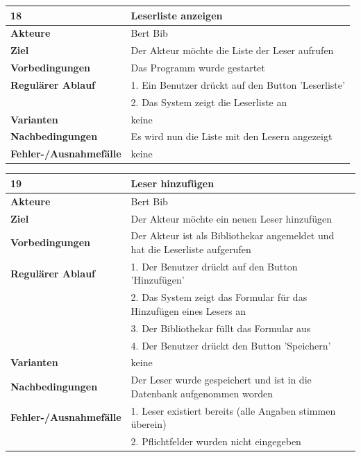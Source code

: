 \documentclass[fontsize=12pt,paper=a4,twoside]{scrartcl}
\begin{document}
\begin{table}[htbp]
\label{18}
\begin{tabular}{|l|p{10cm}|}
\hline 
\textbf{18} & \textbf{Leserliste anzeigen} \\ \hline
\textbf{Akteure} & Bert Bib\\ \hline
\textbf{Ziel} & Der Akteur möchte die Liste der Leser aufrufen  \\ \hline
\textbf{Vorbedingungen} & Das Programm wurde gestartet  \\ \hline
\textbf{Regulärer Ablauf} & 
1. Ein Benutzer drückt auf den Button 'Leserliste' \\
&2. Das System zeigt die Leserliste an\\
\hline
\textbf{Varianten} & 
keine \\ \hline
\textbf{Nachbedingungen} & Es wird nun die Liste mit den Lesern angezeigt \\ \hline
\textbf{Fehler-/Ausnahmefälle} & keine\\
\hline
\end{tabular}
\end{table}

\begin{table}[htbp]
\label{19}
\begin{tabular}{|l|p{10cm}|}
\hline 
\textbf{19} & \textbf{Leser hinzufügen} \\ \hline
\textbf{Akteure} & Bert Bib\\ \hline
\textbf{Ziel} & Der Akteur möchte ein neuen Leser hinzufügen \\ \hline
\textbf{Vorbedingungen} & Der Akteur ist als Bibliothekar angemeldet und hat die Leserliste aufgerufen\\
\hline
\textbf{Regulärer Ablauf} & 
1. Der Benutzer drückt auf den Button 'Hinzufügen' \\
&2. Das System zeigt das Formular für das Hinzufügen eines Lesers an\\
&3. Der Bibliothekar füllt das Formular aus\\
&4. Der Benutzer drückt den Button 'Speichern'\\
\hline
\textbf{Varianten} & 
keine \\ \hline
\textbf{Nachbedingungen} & Der Leser wurde gespeichert und ist in die Datenbank aufgenommen 
worden\\ \hline
\textbf{Fehler-/Ausnahmefälle} & 1. Leser existiert bereits (alle Angaben stimmen überein)\\
&2. Pflichtfelder wurden nicht eingegeben\\
\hline
\end{tabular}
\end{table}
\end{document}
